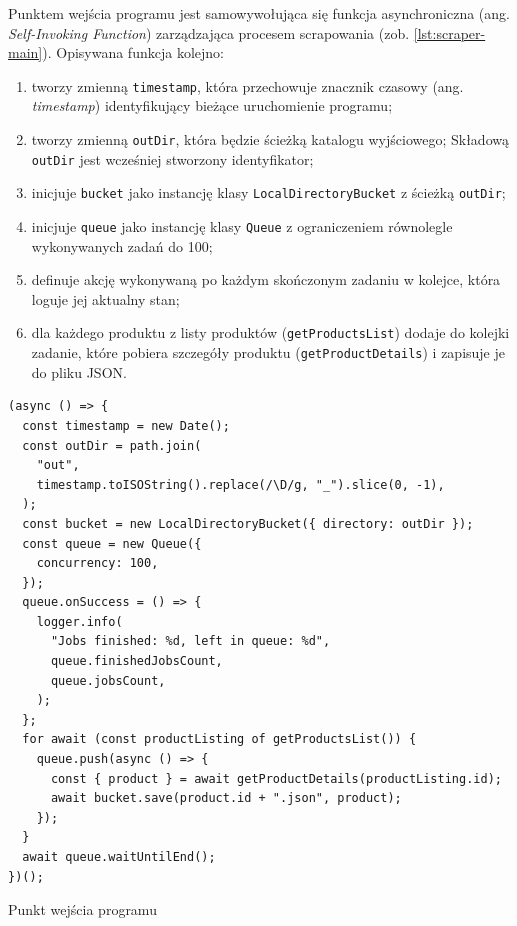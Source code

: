 Punktem wejścia programu jest samowywołująca się funkcja asynchroniczna (ang. \emph{Self-Invoking Function}) zarządzająca procesem scrapowania (zob. \autoref{lst:scraper-main}).
Opisywana funkcja kolejno:
\begin{enumerate}
    \item tworzy zmienną \texttt{timestamp}, która przechowuje znacznik czasowy (ang. \emph{timestamp}) identyfikujący bieżące uruchomienie programu;
    \item tworzy zmienną \texttt{outDir}, która będzie ścieżką katalogu wyjściowego;
    Składową \texttt{outDir} jest wcześniej stworzony identyfikator;
    \item inicjuje \texttt{bucket} jako instancję klasy \texttt{LocalDirectoryBucket} z ścieżką \texttt{outDir};
    \item inicjuje \texttt{queue} jako instancję klasy \texttt{Queue} z ograniczeniem równolegle wykonywanych zadań do 100;
    \item definuje akcję wykonywaną po każdym skończonym zadaniu w kolejce, która loguje jej aktualny stan;
    \item dla każdego produktu z listy produktów (\texttt{getProductsList}) dodaje do kolejki zadanie, które
    pobiera szczegóły produktu (\texttt{getProductDetails}) i zapisuje je do pliku JSON\@.
\end{enumerate}

\begin{listing}[H]
    \begin{verbatim}
(async () => {
  const timestamp = new Date();
  const outDir = path.join(
    "out",
    timestamp.toISOString().replace(/\D/g, "_").slice(0, -1),
  );
  const bucket = new LocalDirectoryBucket({ directory: outDir });
  const queue = new Queue({
    concurrency: 100,
  });
  queue.onSuccess = () => {
    logger.info(
      "Jobs finished: %d, left in queue: %d",
      queue.finishedJobsCount,
      queue.jobsCount,
    );
  };
  for await (const productListing of getProductsList()) {
    queue.push(async () => {
      const { product } = await getProductDetails(productListing.id);
      await bucket.save(product.id + ".json", product);
    });
  }
  await queue.waitUntilEnd();
})();
    \end{verbatim}
    \caption{Punkt wejścia programu}
    \label{lst:scraper-main}
\end{listing}

